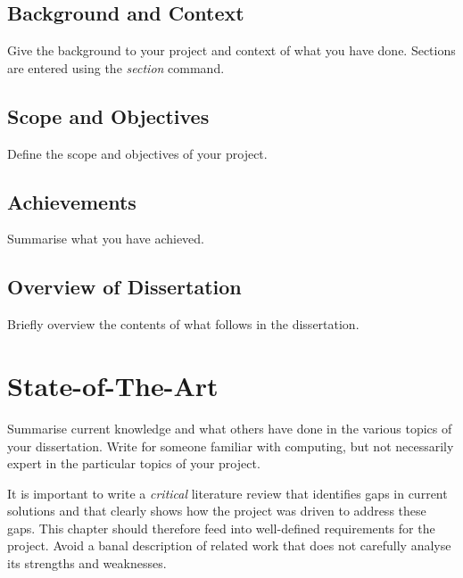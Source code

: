 \documentclass[a4paper,11pt]{report}
\begin{document}
\section{Background and Context}

\label{introduction-background}

Give the background to your project and context of what you have done. Sections
are entered using the \textit{{\bs}section} command.

\section{Scope and Objectives}

\label{introduction-objectives}

Define the scope and objectives of your project.

\section{Achievements}

\label{introduction-achievements}

Summarise what you have achieved.

\section{Overview of Dissertation}

Briefly overview the contents of what follows in the dissertation.



\chapter{State-of-The-Art}

\label{state}
Summarise current knowledge and what others have done in the various topics of
your dissertation. Write for someone familiar with computing, but not
necessarily expert in the particular topics of your project.

It is important to write a {\em critical} literature review that identifies gaps
in current solutions and that clearly shows how the project was driven to
address these gaps. This chapter  should therefore feed into well-defined
requirements for the project. Avoid a banal description of related work that
does not carefully analyse its strengths and weaknesses.
\end{document}
